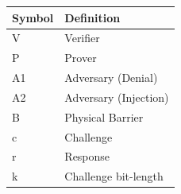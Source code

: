 \begin{tabular}{ll}
\toprule
Symbol & Definition \\
\midrule
V & Verifier \\
P & Prover \\
A1 & Adversary (Denial) \\
A2 & Adversary (Injection) \\
B & Physical Barrier \\
c & Challenge \\
r & Response \\
k & Challenge bit-length \\
\bottomrule
\end{tabular}
